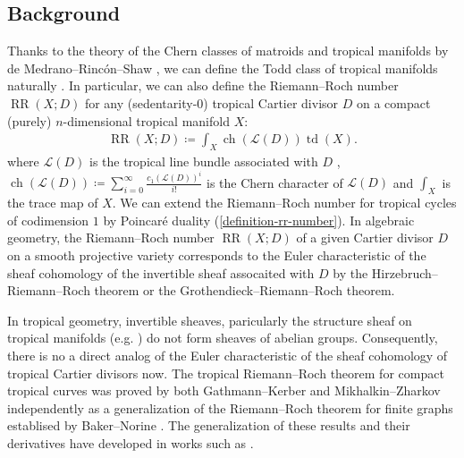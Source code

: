 \documentclass[a4paper,dvipdfmx,reqno,12pt]{amsart}
\theoremstyle{definition}
\newcommand{\deq}{\coloneqq}
\newcommand{\opn}[1]{\operatorname{#1}}
\numberwithin{equation}{section}
\begin{document}
\subsection{Background}
Thanks to the theory of the Chern classes of
matroids and tropical manifolds by 
de Medrano--Rinc\'on--Shaw
\cite{MR3999674,demedrano2023chern},
we can define the Todd class of tropical manifolds
naturally \cite[Conjecture 6.13]{demedrano2023chern}.
In particular, we can also define the Riemann--Roch
number $\opn{RR}(X;D)$ for any (sedentarity-0)
tropical Cartier divisor $D$ on
a compact (purely) $n$-dimensional tropical manifold $X$:
\begin{align}
\label{equation-intro-rr}
\opn{RR}(X;D)\deq 
\int_{X}\opn{ch}(\mathcal{L}(D))\opn{td}(X).
\end{align}
where $\mathcal{L}(D)$ is the 
tropical line bundle associated with $D$
, $\opn{ch}(\mathcal{L}(D))\deq 
\sum_{i=0}^{\infty}\frac{c_1(\mathcal{L}(D))^{i}}{i!}$
is the Chern character of $\mathcal{L}(D)$
and $\int_X$ is the trace map of $X$.
We can extend the Riemann--Roch number for
tropical cycles of codimension $1$
by Poincar\'e duality
(\cref{definition-rr-number}).
In algebraic geometry, the Riemann--Roch number
$\opn{RR}(X;D)$ of a given Cartier divisor $D$
on a smooth projective variety
corresponds to
the Euler characteristic of the sheaf cohomology
of the invertible sheaf 
assocaited with $D$ by the Hirzebruch--Riemann--Roch theorem
or the Grothendieck--Riemann--Roch theorem.

In tropical geometry, invertible sheaves,
paricularly the structure sheaf
on tropical manifolds
(e.g. \cite[]{MR3330789}) 
do not form sheaves of abelian groups.
Consequently, there is no a direct
analog of the Euler characteristic of 
the sheaf cohomology of 
tropical Cartier divisors now.
The tropical Riemann--Roch theorem for 
compact tropical curves was proved by 
both Gathmann--Kerber \cite{MR2377750}
and Mikhalkin--Zharkov \cite{MR2457739}
independently
as a generalization of the 
Riemann--Roch theorem for finite graphs
establised by Baker--Norine \cite{MR2355607}. 
The generalization of these results and
their derivatives have developed in works such as 
\cite{MR3046301,MR4251610,MR4229604,MR4444458,MR4512397}.
\end{document}
